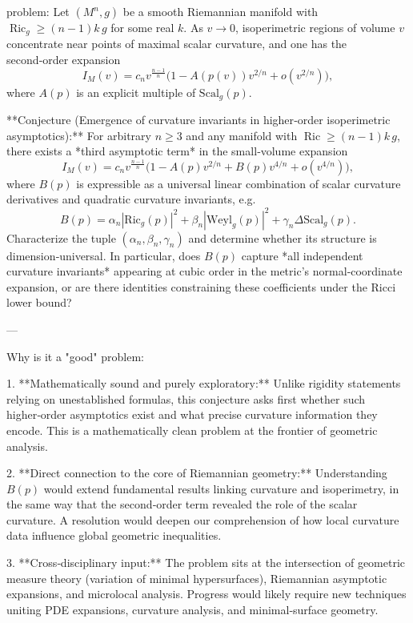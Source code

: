 problem:  
Let \((M^n,g)\) be a smooth Riemannian manifold with \(\operatorname{Ric}_g \ge (n-1)k\,g\) for some real \(k\).  
As \(v\to0\), isoperimetric regions of volume \(v\) concentrate near points of maximal scalar curvature, and one has the second‑order expansion  
\[
I_M(v)=c_n v^{\frac{n-1}{n}}\Big(1 - A(p(v))v^{2/n}+o(v^{2/n})\Big),
\]
where \(A(p)\) is an explicit multiple of \(\mathrm{Scal}_g(p)\).

**Conjecture (Emergence of curvature invariants in higher‑order isoperimetric asymptotics):**  
For arbitrary \(n\ge3\) and any manifold with \(\operatorname{Ric}\ge (n-1)k\,g\), there exists a *third asymptotic term* in the small‑volume expansion  
\[
I_M(v)=c_n v^{\frac{n-1}{n}}\Big(1 - A(p)v^{2/n} + B(p)v^{4/n} + o(v^{4/n})\Big),
\]
where \(B(p)\) is expressible as a universal linear combination of scalar curvature derivatives and quadratic curvature invariants, e.g.  
\[
B(p)=\alpha_n |\mathrm{Ric}_g(p)|^2 + \beta_n |\mathrm{Weyl}_g(p)|^2 + \gamma_n \Delta\mathrm{Scal}_g(p).
\]
Characterize the tuple \((\alpha_n,\beta_n,\gamma_n)\) and determine whether its structure is dimension‑universal.  
In particular, does \(B(p)\) capture *all independent curvature invariants* appearing at cubic order in the metric’s normal‑coordinate expansion, or are there identities constraining these coefficients under the Ricci lower bound?

---

Why is it a "good" problem:  

1. **Mathematically sound and purely exploratory:**  
   Unlike rigidity statements relying on unestablished formulas, this conjecture asks first whether such higher‑order asymptotics exist and what precise curvature information they encode. This is a mathematically clean problem at the frontier of geometric analysis.

2. **Direct connection to the core of Riemannian geometry:**  
   Understanding \(B(p)\) would extend fundamental results linking curvature and isoperimetry, in the same way that the second‑order term revealed the role of the scalar curvature. A resolution would deepen our comprehension of how local curvature data influence global geometric inequalities.

3. **Cross‑disciplinary input:**  
   The problem sits at the intersection of geometric measure theory (variation of minimal hypersurfaces), Riemannian asymptotic expansions, and microlocal analysis. Progress would likely require new techniques uniting PDE expansions, curvature analysis, and minimal‑surface geometry.

